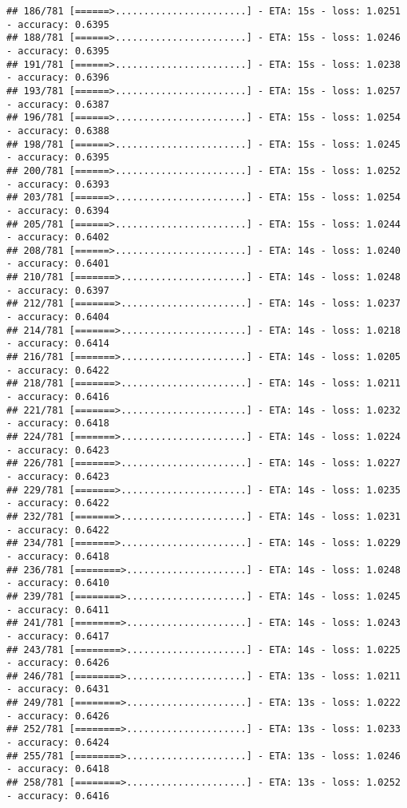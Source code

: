 \documentclass[
]{article}
\begin{document}
\begin{verbatim}
## 186/781 [======>.......................] - ETA: 15s - loss: 1.0251 - accuracy: 0.6395
## 188/781 [======>.......................] - ETA: 15s - loss: 1.0246 - accuracy: 0.6395
## 191/781 [======>.......................] - ETA: 15s - loss: 1.0238 - accuracy: 0.6396
## 193/781 [======>.......................] - ETA: 15s - loss: 1.0257 - accuracy: 0.6387
## 196/781 [======>.......................] - ETA: 15s - loss: 1.0254 - accuracy: 0.6388
## 198/781 [======>.......................] - ETA: 15s - loss: 1.0245 - accuracy: 0.6395
## 200/781 [======>.......................] - ETA: 15s - loss: 1.0252 - accuracy: 0.6393
## 203/781 [======>.......................] - ETA: 15s - loss: 1.0254 - accuracy: 0.6394
## 205/781 [======>.......................] - ETA: 15s - loss: 1.0244 - accuracy: 0.6402
## 208/781 [======>.......................] - ETA: 14s - loss: 1.0240 - accuracy: 0.6401
## 210/781 [=======>......................] - ETA: 14s - loss: 1.0248 - accuracy: 0.6397
## 212/781 [=======>......................] - ETA: 14s - loss: 1.0237 - accuracy: 0.6404
## 214/781 [=======>......................] - ETA: 14s - loss: 1.0218 - accuracy: 0.6414
## 216/781 [=======>......................] - ETA: 14s - loss: 1.0205 - accuracy: 0.6422
## 218/781 [=======>......................] - ETA: 14s - loss: 1.0211 - accuracy: 0.6416
## 221/781 [=======>......................] - ETA: 14s - loss: 1.0232 - accuracy: 0.6418
## 224/781 [=======>......................] - ETA: 14s - loss: 1.0224 - accuracy: 0.6423
## 226/781 [=======>......................] - ETA: 14s - loss: 1.0227 - accuracy: 0.6423
## 229/781 [=======>......................] - ETA: 14s - loss: 1.0235 - accuracy: 0.6422
## 232/781 [=======>......................] - ETA: 14s - loss: 1.0231 - accuracy: 0.6422
## 234/781 [=======>......................] - ETA: 14s - loss: 1.0229 - accuracy: 0.6418
## 236/781 [========>.....................] - ETA: 14s - loss: 1.0248 - accuracy: 0.6410
## 239/781 [========>.....................] - ETA: 14s - loss: 1.0245 - accuracy: 0.6411
## 241/781 [========>.....................] - ETA: 14s - loss: 1.0243 - accuracy: 0.6417
## 243/781 [========>.....................] - ETA: 14s - loss: 1.0225 - accuracy: 0.6426
## 246/781 [========>.....................] - ETA: 13s - loss: 1.0211 - accuracy: 0.6431
## 249/781 [========>.....................] - ETA: 13s - loss: 1.0222 - accuracy: 0.6426
## 252/781 [========>.....................] - ETA: 13s - loss: 1.0233 - accuracy: 0.6424
## 255/781 [========>.....................] - ETA: 13s - loss: 1.0246 - accuracy: 0.6418
## 258/781 [========>.....................] - ETA: 13s - loss: 1.0252 - accuracy: 0.6416

\end{verbatim}
\end{document}
